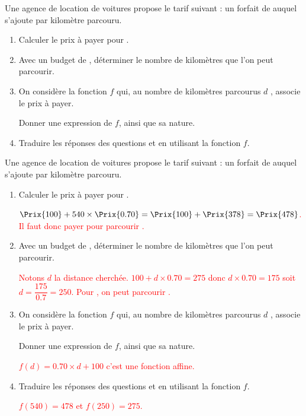 \begin{exercice*}
    Une agence de location de voitures propose le tarif suivant : un forfait de  auquel s'ajoute  par kilomètre parcouru.
    \begin{enumerate}
        \item Calculer le prix à payer pour .
        \item Avec un budget de , déterminer le nombre de kilomètres que l'on peut parcourir.
        \item On considère la fonction $f$ qui, au nombre de kilomètres parcourus $d$ , associe le prix à payer.
        
        Donner une expression de $f$, ainsi que sa nature.
        \item Traduire les réponses des questions \setcounter{enumi}{0}\theenumi et \setcounter{enumi}{1}\theenumi en utilisant la fonction $f$.
    \end{enumerate}
\end{exercice*}
\begin{corrige}
    Une agence de location de voitures propose le tarif suivant : un forfait de  auquel s'ajoute  par kilomètre parcouru.

    \begin{enumerate}
        \item Calculer le prix à payer pour .
        
        \textcolor{red}{$\Prix{100} + 540\times\Prix{0.70}=\Prix{100}+\Prix{378}=\Prix{478}$. Il faut donc payer  pour parcourir .}
        \item Avec un budget de , déterminer le nombre de kilomètres que l'on peut parcourir.
        
        \textcolor{red}{Notons $d$ la distance cherchée. $100+d\times\num{0.70}=275$ donc $d\times\num{0.70}=175$ soit $d=\dfrac{175}{0.7}=250$. Pour , on peut parcourir .}
        \item On considère la fonction $f$ qui, au nombre de kilomètres parcourus $d$ , associe le prix à payer.
        
        Donner une expression de $f$, ainsi que sa nature.

        \textcolor{red}{$f(d)=\num{0.70}\times d+100$ c'est une fonction affine.}
        \item Traduire les réponses des questions \setcounter{enumi}{0}\theenumi et \setcounter{enumi}{1}\theenumi en utilisant la fonction $f$.
        
        \textcolor{red}{$f(540)=478$ et $f(250)=275$.}
    \end{enumerate}
\end{corrige}

